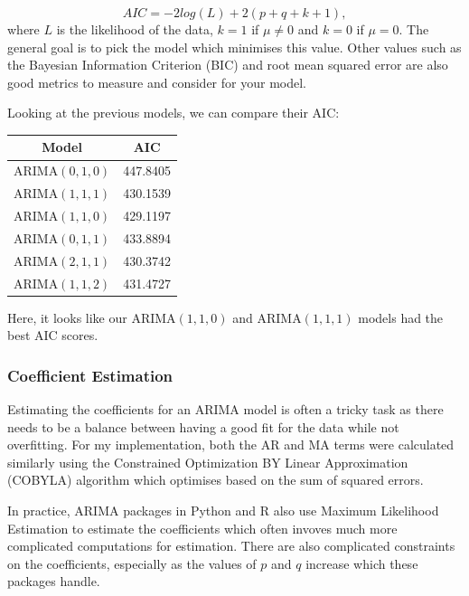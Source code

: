 \documentclass{article}
\begin{document}
  \begin{equation*}
    AIC = -2log(L) + 2(p + q + k + 1),
  \end{equation*}
  where $L$ is the likelihood of the data, $k = 1$ if $\mu \ne 0$ and $k = 0$ if $\mu = 0$. The general goal is to pick the model which minimises this value. Other values such as the Bayesian Information Criterion (BIC) and root mean squared error are also good metrics to measure and consider for your model.

  Looking at the previous models, we can compare their AIC:
  \begin{center}
    \begin{tabular}{||c c||} 
     \hline
     Model & AIC \\ [0.5ex] 
     \hline\hline
     ARIMA$(0,1,0)$ & 447.8405 \\ 
     \hline
     ARIMA$(1,1,1)$ & 430.1539 \\
     \hline
     ARIMA$(1,1,0)$ & 429.1197 \\ 
     \hline
     ARIMA$(0,1,1)$ & 433.8894 \\
     \hline
     ARIMA$(2,1,1)$ & 430.3742 \\
     \hline
     ARIMA$(1,1,2)$ & 431.4727 \\
     \hline
    \end{tabular}
  \end{center}
  Here, it looks like our ARIMA$(1,1,0)$ and ARIMA$(1,1,1)$ models had the best AIC scores.

  \subsubsection{Coefficient Estimation}
  Estimating the coefficients for an ARIMA model is often a tricky task as there needs to be a balance between having a good fit for the data while not overfitting. For my implementation, both the AR and MA terms were calculated similarly using the Constrained Optimization BY Linear Approximation (COBYLA) algorithm which optimises based on the sum of squared errors.
  
  In practice, ARIMA packages in Python and R also use Maximum Likelihood Estimation to estimate the coefficients which often invoves much more complicated computations for estimation. There are also complicated constraints on the coefficients, especially as the values of $p$ and $q$ increase which these packages handle.

  \newpage
\end{document}
